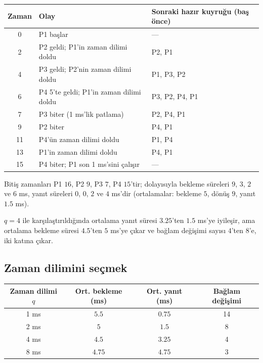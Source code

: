 \documentclass[11pt,a4paper]{article}
\begin{document}
\begin{center}
\renewcommand{\arraystretch}{1.15}
\begin{tabular}{@{}cll@{}}
\toprule
\textbf{Zaman} & \textbf{Olay} & \textbf{Sonraki hazır kuyruğu (baş önce)}\\
\midrule
0 & P1 başlar & --- \\
2 & P2 geldi; P1'in zaman dilimi doldu & P2, P1 \\
4 & P3 geldi; P2'nin zaman dilimi doldu & P1, P3, P2 \\
6 & P4 5'te geldi; P1'in zaman dilimi doldu & P3, P2, P4, P1 \\
7 & P3 biter (1 ms'lik patlama) & P2, P4, P1 \\
9 & P2 biter & P4, P1 \\
11 & P4'ün zaman dilimi doldu & P1, P4 \\
13 & P1'in zaman dilimi doldu & P4, P1 \\
15 & P4 biter; P1 son 1 ms'sini çalışır & --- \\
\bottomrule
\end{tabular}
\end{center}

Bitiş zamanları P1 $16$, P2 $9$, P3 $7$, P4 $15$'tir; dolayısıyla bekleme süreleri $9$, $3$, $2$ ve $6$ ms, yanıt süreleri $0$, $0$, $2$ ve $4$ ms'dir (ortalamalar: bekleme $5$, dönüş $9$, yanıt $1.5$ ms).

$q=4$ ile karşılaştırıldığında ortalama yanıt süresi $3.25$'ten $1.5$ ms'ye iyileşir, ama ortalama bekleme süresi $4.5$'ten $5$ ms'ye çıkar ve bağlam değişimi sayısı $4$'ten $8$'e, iki katına çıkar.

\subsection{Zaman dilimini seçmek}

\begin{center}
\renewcommand{\arraystretch}{1.2}
\begin{tabular}{@{}cccc@{}}
\toprule
\textbf{Zaman dilimi $q$} & \textbf{Ort. bekleme (ms)} & \textbf{Ort. yanıt (ms)} & \textbf{Bağlam değişimi}\\
\midrule
1 ms & $5.5$ & $0.75$ & 14\\
2 ms & $5$ & $1.5$ & 8\\
4 ms & $4.5$ & $3.25$ & 4\\
8 ms & $4.75$ & $4.75$ & 3\\
\bottomrule
\end{tabular}
\end{center}
\end{document}
